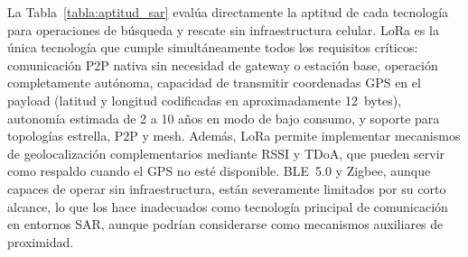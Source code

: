 La Tabla~\ref{tabla:aptitud_sar} evalúa directamente la aptitud de cada tecnología para operaciones de búsqueda y rescate sin infraestructura celular. LoRa es la única tecnología que cumple simultáneamente todos los requisitos críticos: comunicación P2P nativa sin necesidad de gateway o estación base, operación completamente autónoma, capacidad de transmitir coordenadas GPS en el payload (latitud y longitud codificadas en aproximadamente 12~bytes), autonomía estimada de 2 a 10 años en modo de bajo consumo, y soporte para topologías estrella, P2P y mesh. Además, LoRa permite implementar mecanismos de geolocalización complementarios mediante RSSI y TDoA, que pueden servir como respaldo cuando el GPS no esté disponible. BLE~5.0 y Zigbee, aunque capaces de operar sin infraestructura, están severamente limitados por su corto alcance, lo que los hace inadecuados como tecnología principal de comunicación en entornos SAR, aunque podrían considerarse como mecanismos auxiliares de proximidad.

\begin{table}[H]
\begin{center}
\caption{Evaluación de aptitud de cada tecnología para operaciones de búsqueda y rescate (SAR) sin infraestructura celular.}
\label{tabla:aptitud_sar}
\end{center}
\end{table}

